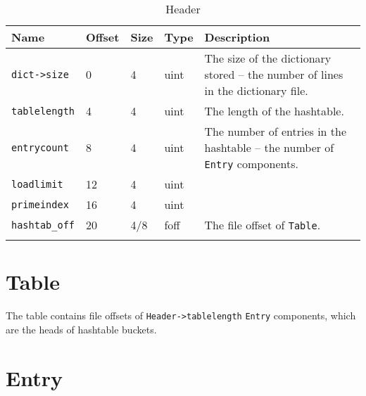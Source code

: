 \documentclass[a4paper,12pt]{article}
\begin{document}
\begin{longtable}{|p{1in}|p{0.6in}|p{0.6in}|p{0.6in}|p{2.7in}|}
\hline
{\bf Name} & {\bf Offset} & {\bf Size} & {\bf Type} & {\bf Description}\\
\hline
\endhead

\verb#dict->size# & 0 & 4 & uint & The size of the dictionary stored --
the number of lines in the dictionary file.

\\
\hline

\verb#tablelength# & 4 & 4 & uint & The length of the hashtable.

\\
\hline

\verb#entrycount# & 8 & 4 & uint & The number of entries in the hashtable --
the number of \verb#Entry# components.

\\
\hline

\verb#loadlimit# & 12 & 4 & uint &

\\
\hline

\verb#primeindex# & 16 & 4 & uint &

\\
\hline

\verb#hashtab_off# & 20 & 4/8 & foff & The file offset of \verb#Table#.

\\
\hline
\caption{Header}
\end{longtable}



\section{Table}

The table contains file offsets of \verb#Header->tablelength# \verb#Entry#
components, which are the heads of hashtable buckets.
\medskip

\section{Entry}
\end{document}
